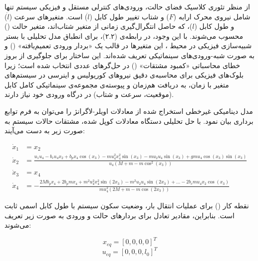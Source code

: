 از منظر تئوری کلاسیک فضای حالت، ورودی‌های کنترلی مستقل و فیزیکی سیستم تنها شامل نیروی محرک ارابه ($F$) و شتاب تغییر طول کابل ($\ddot{l}$) است. متغیرهای سرعت ($\dot{l}$) و طول کابل ($l$)، که حاصل انتگرال‌گیری زمانی از متغیر شتاب‌اند، متغیر حالت () محسوب می‌شوند. با این وجود، در رابطه‌ی (۲.۲)، برای انطباق مدل تحلیلی با بستر شبیه‌سازی فیزیکی در محیط ، این متغیرها در قالب یک «بردار ورودی تعمیم‌یافته» () و به صورت شبه-ورودی‌های سینماتیکی تعریف شده‌اند. این ساختار برای جلوگیری از بروز خطای محاسباتی «کمبود مشتقات» () در حل‌گرهای عددی انتخاب شده است؛ زیرا بلوک‌های فیزیکی برای محاسبه‌ی دقیق نیروهای کوریولیس و اینرسی در سیستم‌های متغیر با زمان، به دریافت هم‌زمان و پیوسته‌ی مجموعه‌ی سینماتیکی کامل کابل (موقعیت، سرعت و شتاب) در درگاه ورودی خود نیاز دارند.

مدل دینامیکی غیرخطی استخراج شده از معادلات اویلر-لاگرانژ را می‌توان به فرم توابع برداری  بیان نمود. با حل تحلیلی دستگاه معادلات کوپل شده، مشتقات حالات سیستم به صورت زیر به دست می‌آیند:

\begin{align}
    \dot{x}_1 & = x_2                                                                                                                                                         \\
    \dot{x}_2 & = \frac{u_1 u_4 - b_c u_4 x_2 + b_p x_4 \cos(x_3) - m u_4^2 x_4^2 \sin(x_3) - m u_2 u_4 \sin(x_3) + g m u_4 \cos(x_3) \sin(x_3)}{u_4 (M + m - m \cos^2(x_3))} \\
    \dot{x}_3 & = x_4                                                                                                                                                         \\
    \dot{x}_4 & = -\frac{2M b_p x_4 + 2b_p m x_4 + m^2 u_4^2 x_4^2 \sin(2x_3) - m^2 u_2 u_4 \sin(2x_3) + \dots - 2b_c m u_4 x_2 \cos(x_3)}{m u_4^2 (2M + m - m \cos(2x_3))}
\end{align}

نقطه کار () برای عملیات انتقال بار، وضعیت سکون سیستم با طول کابل اسمی ثابت است. بنابراین، مقادیر تعادل برای بردارهای حالت و ورودی به صورت زیر تعریف می‌شوند:

\begin{equation}
    x_{eq} = [0, 0, 0, 0]^T
\end{equation}
\begin{equation}
    u_{eq} = [0, 0, 0, l_0]^T
\end{equation}

